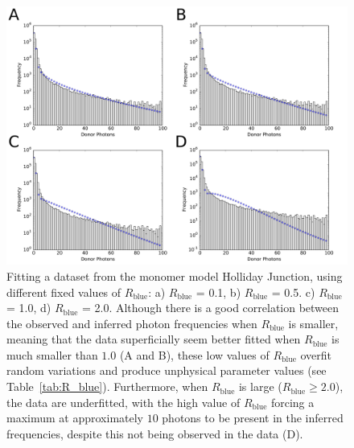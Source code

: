 \begin{figure}
   \begin{center}
      \includegraphics*[clip=true, width=6.5in]{sizing/vary_Rblue.pdf}
      \caption{Fitting a dataset from the monomer model Holliday Junction, using different fixed values of $R_{\text{blue}}$: a) $R_{\text{blue}}$ = 0.1, b) $R_{\text{blue}}$ = 0.5. c) $R_{\text{blue}}$ = 1.0, d) $R_{\text{blue}}$ = 2.0. Although there is a good correlation between the observed and inferred photon frequencies when $R_{\text{blue}}$ is smaller, meaning that the data superficially seem better fitted when $R_{\text{blue}}$ is much smaller than $1.0$ (A and B), these low values of $R_{\text{blue}}$ overfit random variations and produce unphysical parameter values (see Table~\ref{tab:R_blue}). Furthermore, when $R_{\text{blue}}$ is large ($R_{\text{blue}} \ge 2.0$), the data are underfitted, with the high value of $R_{\text{blue}}$ forcing a maximum at approximately $10$ photons to be present in the inferred frequencies, despite this not being observed in the data (D).} 
      \label{fig:vary_Rblue}
   \end{center}
\end{figure}

